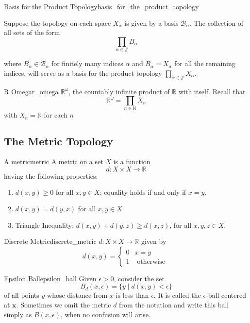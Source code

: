 \begin{theorem}{Basis for the Product Topology}{basis_for_the_product_topology}

Suppose the topology on each space $X_{\alpha}$ is given by a basis $\mathcal{B}_{\alpha}$. The collection of all sets of the form
\[
\prod_{\alpha \in \mathcal{ J } } B_{\alpha}
\]

where $B_{\alpha} \in \mathcal{ B } _{\alpha}$ for finitely many indices $\alpha$ and $B_{\alpha}=X_{\alpha}$ for all the remaining indices, will serve as a basis for the product topology $\prod_{\alpha \in \mathcal{ J } } X_{\alpha}$.
\end{theorem}

\begin{definition}{R Omega}{r_omega}
$\mathbb{R}^{\omega}$, the countably infinite product of $\mathbb{R}$ with itself. Recall that
$$
\mathbb{R}^{\omega}=\prod_{n \in \mathbb{N}} X_{n}
$$
with $ X_{ n }  =  \mathbb{R}  $ for each $ n $ 
\end{definition}


\subsection{The Metric Topology}

\begin{definition}{A metric}{metric}
A metric on a set $X$ is a function
$$
d: X \times X \longrightarrow \mathbb{R} 
$$
having the following properties:
\begin{enumerate}
       \item $d(x, y) \geq 0$ for all $x, y \in X$; equality holds if and only if $x=y$.
       \item $d(x, y)=d(y, x)$ for all $x, y \in X$.
       \item Triangle Inequality: $d(x, y)+d(y, z) \geq d(x, z)$, for all $x, y, z \in X$.
\end{enumerate}
\end{definition}

\begin{example}{Discrete Metric}{discrete_metric}
 $d: X \times X \rightarrow \mathbb{R}$ given by
$$
d(x, y)= \begin{cases}0 & x=y \\ 1 & \text { otherwise }\end{cases}
$$
\end{example}


\begin{definition}{Epsilon Ball}{epsilon_ball}
Given $\epsilon>0$, consider the set
$$
B_{d}(x, \epsilon)=\{y \mid d(x, y)<\epsilon\}
$$
of all points $y$ whose distance from $x$ is less than $\epsilon$. It is called the $\epsilon$-ball centered at $\boldsymbol{x}$. Sometimes we omit the metric $d$ from the notation and write this ball simply as $B(x, \epsilon)$, when no confusion will arise.
\end{definition}

